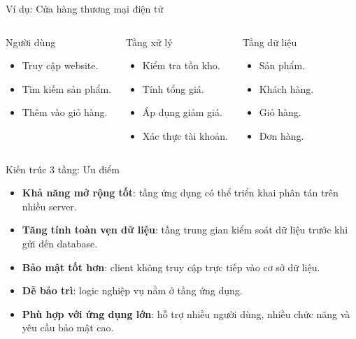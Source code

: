 \documentclass[aspectratio=169,11pt]{beamer}
\newcommand{\keyword}[1]{\textcolor{accent}{\textbf{#1}}}
\newcommand{\tightlist}{\setlength{\itemsep}{2pt}\setlength{\parskip}{0pt}}
\begin{document}
\begin{frame}{Ví dụ: Cửa hàng thương mại điện tử}
\small
\begin{columns}[T]
\begin{block}{Người dùng}
\begin{itemize}
\tightlist
  \item Truy cập website.
  \item Tìm kiếm sản phẩm.
  \item Thêm vào giỏ hàng.
\end{itemize}
\end{block}

\begin{block}{Tầng xử lý}
\begin{itemize}
\tightlist
  \item Kiểm tra tồn kho.
  \item Tính tổng giá.
  \item Áp dụng giảm giá.
  \item Xác thực tài khoản.
\end{itemize}
\end{block}

\begin{block}{Tầng dữ liệu}
\begin{itemize}
\tightlist
  \item Sản phẩm.
  \item Khách hàng.
  \item Giỏ hàng.
  \item Đơn hàng.
\end{itemize}
\end{block}
\end{columns}
\end{frame}

\begin{frame}{Kiến trúc 3 tầng: Ưu điểm}
\small
\begin{itemize}
\tightlist
  \item \keyword{Khả năng mở rộng tốt}: tầng ứng dụng có thể triển khai phân tán trên nhiều server.
  \item \keyword{Tăng tính toàn vẹn dữ liệu}: tầng trung gian kiểm soát dữ liệu trước khi gửi đến database.
  \item \keyword{Bảo mật tốt hơn}: client không truy cập trực tiếp vào cơ sở dữ liệu.
  \item \keyword{Dễ bảo trì}: logic nghiệp vụ nằm ở tầng ứng dụng.
  \item \keyword{Phù hợp với ứng dụng lớn}: hỗ trợ nhiều người dùng, nhiều chức năng và yêu cầu bảo mật cao.
\end{itemize}
\end{frame}
\end{document}
